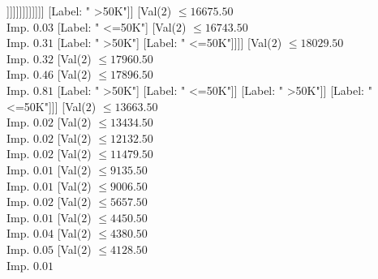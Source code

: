 \documentclass[margin=10pt]{standalone}
\begin{document}
\begin{forest}
																			[Label: " >50K"]
																			[Val($2$) $ \leq 12289.50$ \\ Imp. $0.02$
																				[Label: " <=50K"]
																				[Val($2$) $ \leq 12304.50$ \\ Imp. $0.10$
																					[Label: " >50K"]
																					[Val($2$) $ \leq 12931.50$ \\ Imp. $0.02$
																						[Label: " <=50K"]
																						[Val($2$) $ \leq 12974.50$ \\ Imp. $0.14$
																							[Label: " >50K"]
																							[Val($2$) $ \leq 14063.50$ \\ Imp. $0.05$
																								[Label: " <=50K"]
																								[Val($2$) $ \leq 14079.50$ \\ Imp. $0.47$
																									[Label: " >50K"]
																									[Label: " <=50K"]]]]]]]]]]]]]
													[Label: " >50K"]]
												[Val($2$) $ \leq 16675.50$ \\ Imp. $0.03$
													[Label: " <=50K"]
													[Val($2$) $ \leq 16743.50$ \\ Imp. $0.31$
														[Label: " >50K"]
														[Label: " <=50K"]]]]
											[Val($2$) $ \leq 18029.50$ \\ Imp. $0.32$
												[Val($2$) $ \leq 17960.50$ \\ Imp. $0.46$
													[Val($2$) $ \leq 17896.50$ \\ Imp. $0.81$
														[Label: " >50K"]
														[Label: " <=50K"]]
													[Label: " >50K"]]
												[Label: " <=50K"]]]
										[Val($2$) $ \leq 13663.50$ \\ Imp. $0.02$
											[Val($2$) $ \leq 13434.50$ \\ Imp. $0.02$
												[Val($2$) $ \leq 12132.50$ \\ Imp. $0.02$
													[Val($2$) $ \leq 11479.50$ \\ Imp. $0.01$
														[Val($2$) $ \leq 9135.50$ \\ Imp. $0.01$
															[Val($2$) $ \leq 9006.50$ \\ Imp. $0.02$
																[Val($2$) $ \leq 5657.50$ \\ Imp. $0.01$
																	[Val($2$) $ \leq 4450.50$ \\ Imp. $0.04$
																		[Val($2$) $ \leq 4380.50$ \\ Imp. $0.05$
																			[Val($2$) $ \leq 4128.50$ \\ Imp. $0.01$

\end{forest}
\end{document}

